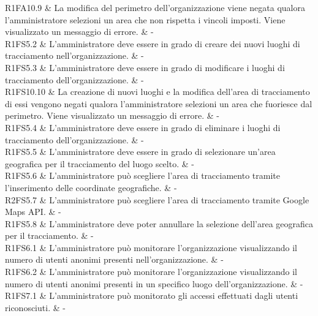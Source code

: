 R1FA10.9 & La modifica del perimetro dell'organizzazione viene negata qualora l'amministratore selezioni un area che non rispetta i vincoli imposti. Viene visualizzato un messaggio di errore.  & - \\

R1FS5.2 & L'amministratore deve essere in grado di creare dei nuovi luoghi di tracciamento nell'organizzazione.  & - \\

R1FS5.3 & L'amministratore deve essere in grado di modificare i luoghi di tracciamento dell'organizzazione.  & - \\

R1FS10.10 & La creazione di nuovi luoghi e la modifica dell'area di tracciamento di essi vengono negati qualora l'amministratore selezioni un area che fuoriesce dal perimetro. Viene visualizzato un messaggio di errore.  & - \\

R1FS5.4 & L'amministratore deve essere in grado di eliminare i luoghi di tracciamento dell'organizzazione.  & - \\

R1FS5.5 & L'amministratore deve essere in grado di selezionare un'area geografica per il tracciamento del luogo scelto.  & - \\

R1FS5.6 &  L'amministratore può scegliere l'area di tracciamento tramite l'inserimento delle coordinate geografiche.  & - \\

R2FS5.7 & L'amministratore può scegliere l'area di tracciamento tramite Google Maps API. & - \\

R1FS5.8 & L'amministratore deve poter annullare la selezione dell'area geografica per il tracciamento. & - \\

R1FS6.1 & L'amministratore può monitorare l'organizzazione visualizzando il numero di utenti anonimi presenti nell'organizzazione.  & - \\

R1FS6.2 & L'amministratore può monitorare l'organizzazione visualizzando il numero di utenti anonimi presenti in un specifico luogo dell'organizzazione.  & - \\

R1FS7.1 & L'amministratore può monitorato gli accessi effettuati dagli utenti riconosciuti.  & - \\

